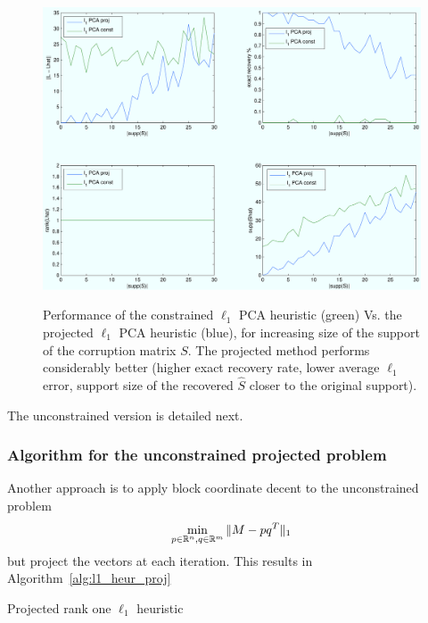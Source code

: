 \begin{figure}[h!]
\centering
\includegraphics[width=\textwidth]{../figures/l1pca_proj_vs_const.pdf}
\label{fig:l1pca_const_vs_proj}
\caption{Performance of the constrained $\ell_1$ PCA heuristic (green) Vs. the projected $\ell_1$ PCA heuristic (blue), for increasing size of the support of the corruption matrix $S$. The projected method performs considerably better (higher exact recovery rate, lower average $\ell_1$ error, support size of the recovered $\hat{S}$ closer to the original support).}
\end{figure}

\newpage
The unconstrained version is detailed next.

\subsubsection{Algorithm for the unconstrained projected problem} 
Another approach is to apply block coordinate decent to the unconstrained problem
\[
\begin{aligned}
\min_{p \in {\mathbb R}^n, q \in {\mathbb R}^m} \|M - pq^T\|_1
\end{aligned}
\]
but project the vectors at each iteration. This results in Algorithm~\ref{alg:l1_heur_proj}

\begin{algorithm}[h]
\caption{Projected rank one $\ell_1$ heuristic}
\label{alg:l1_heur_proj}
\end{algorithm}

